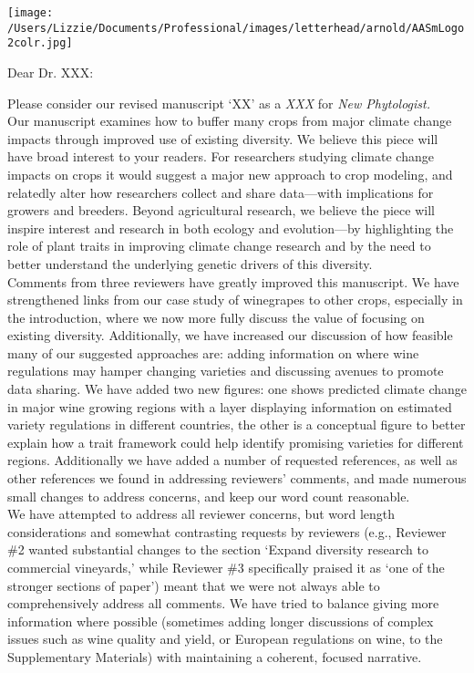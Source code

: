 \documentclass[11pt,a4paper]{letter}
\begin{document}
\begin{letter}{}
\texttt{[image: /Users/Lizzie/Documents/Professional/images/letterhead/arnold/AASmLogo2colr.jpg]}

\opening{Dear Dr. XXX:}

\noindent Please consider our revised manuscript `XX' as a \emph{XXX} for \emph{New Phytologist.} 
\vspace{1.5ex}\\
Our manuscript examines how to buffer many crops from major climate change impacts through improved use of existing diversity. We believe this piece will have broad interest to your readers. For researchers studying climate change impacts on crops it would suggest a major new approach to crop modeling, and relatedly alter how researchers collect and share data---with implications for growers and breeders. Beyond agricultural research, we believe the piece will inspire interest and research in both ecology and evolution---by highlighting the role of plant traits in improving climate change research and by the need to better understand the underlying genetic drivers of this diversity. 
\vspace{1.5ex}\\
Comments from three reviewers have greatly improved this manuscript. We have strengthened links from our case study of winegrapes to other crops, especially in the introduction, where we now more fully discuss the value of focusing on existing diversity. Additionally, we have increased our discussion of how feasible many of our suggested approaches are: adding information on where wine regulations may hamper changing varieties and discussing avenues to promote data sharing. We have added two new figures: one shows predicted climate change in major wine growing regions with a layer displaying information on estimated variety regulations in different countries, the other is a conceptual figure to better explain how a trait framework could help identify promising varieties for different regions. Additionally we have added a number of requested references, as well as other references we found in addressing reviewers' comments, and made numerous small changes to address concerns, and keep our word count reasonable. 
\vspace{1.5ex}\\
We have attempted to address all reviewer concerns, but word length considerations and somewhat contrasting requests by reviewers (e.g., Reviewer \#2 wanted substantial changes to the section `Expand diversity research to commercial vineyards,' while Reviewer \#3 specifically praised it as `one of the stronger sections of paper') meant that we were not always able to comprehensively address all comments. We have tried to balance giving more information where possible (sometimes adding longer discussions of complex issues such as wine quality and yield, or European regulations on wine, to the Supplementary Materials) with maintaining a coherent, focused narrative. 

\end{letter}
\end{document}
